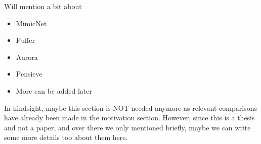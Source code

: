 Will mention a bit about 
\begin{itemize}
\item MimicNet\cite{zhangMimicNetFastPerformance2021}
\item Puffer\cite{puffer} 
\item Aurora\cite{jayDeepReinforcementLearning2019}
\item Pensieve\cite{maoNeuralAdaptiveVideo2017}
\item More can be added later  
\end{itemize}

In hindsight, maybe this section is NOT needed anymore as relevant comparisons have already been made in the motivation section. However, since this is a thesis and not a paper, and over there we only mentioned briefly, maybe we can write some more details too about them here.



